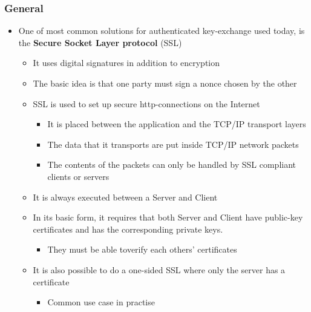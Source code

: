 \documentclass[11pt]{article}
\begin{document}
\subsubsection{General}
\label{sec:orgcb2acc4}
\begin{itemize}
\item One of most common solutions for authenticated key-exchange used today, is the \textbf{Secure Socket Layer protocol} (SSL)
\begin{itemize}
\item It uses digital signatures in addition to encryption
\item The basic idea is that one party must sign a nonce chosen by the other
\item SSL is used to set up secure http-connections on the Internet
\begin{itemize}
\item It is placed between the application and the TCP/IP transport layers
\item The data that it transports are put inside TCP/IP network packets
\item The contents of the packets can only be handled by SSL compliant clients or servers
\end{itemize}
\item It is always executed between a Server and Client
\item In its basic form, it requires that both Server and Client have public-key certificates and has the corresponding private keys.
\begin{itemize}
\item They must be able toverify each others' certificates
\end{itemize}
\item It is also possible to do a one-sided SSL where only the server has a certificate
\begin{itemize}
\item Common use case in practise
\end{itemize}
\end{itemize}


\end{itemize}
\end{document}
